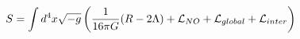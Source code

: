 \begin{equation}
\label{action}
S=\int d^4 x \sqrt{-g} \left( \frac{1}{16\pi G} (R-2\Lambda) + {\cal L}_{NO}+ 
{\cal L}_{global} + {\cal L}_{inter} \right)
\end{equation}

